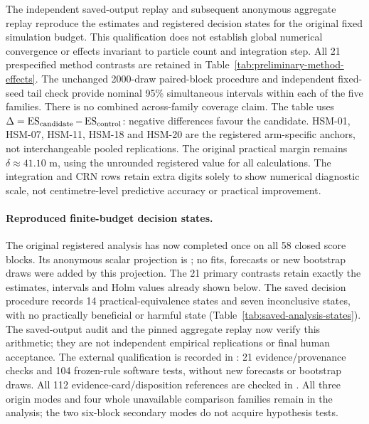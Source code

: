 The independent saved-output replay and subsequent anonymous aggregate replay
reproduce the estimates and registered decision states for the original fixed
simulation budget. This qualification does not establish global numerical
convergence or effects invariant to particle count and integration step.
All 21 prespecified
method contrasts are retained in Table~\ref{tab:preliminary-method-effects}.
The unchanged 2000-draw paired-block procedure and independent fixed-seed
tail check provide nominal 95\% simultaneous intervals within each of the
five families. There is no combined across-family coverage claim.
The table uses $\Delta=\operatorname{ES}_{\mathrm{candidate}}-\operatorname{ES}_{\mathrm{control}}$:
negative differences favour the candidate. HSM-01, HSM-07, HSM-11, HSM-18 and
HSM-20 are the registered arm-specific anchors, not interchangeable pooled
replications. The original practical margin remains $\delta\approx41.10$ m,
using the unrounded registered value for all calculations. The integration
and CRN rows retain extra digits solely to show numerical diagnostic scale,
not centimetre-level predictive accuracy or practical improvement.

\paragraph{Reproduced finite-budget decision states.}
\label{sec:saved-analysis-status}\hypertarget{sec:saved-analysis-status}{}
The original registered analysis has now completed once on all 58 closed
score blocks. Its anonymous scalar projection is
; no fits, forecasts or
new bootstrap draws were added by this projection. The 21 primary contrasts
retain exactly the estimates, intervals and Holm values already shown below.
The saved decision procedure records 14 practical-equivalence states and
seven inconclusive states, with no practically beneficial or harmful state
(Table~\ref{tab:saved-analysis-states}). The saved-output audit and the pinned
aggregate replay now verify this arithmetic; they are not independent empirical
replications or final human acceptance. The external qualification is recorded
in : 21 evidence/provenance
checks and 104 frozen-rule software tests, without new forecasts or bootstrap
draws. All 112 evidence-card/disposition references are checked in
. All three origin
modes and four whole unavailable comparison families remain in the analysis;
the two six-block secondary modes do not acquire hypothesis tests.

